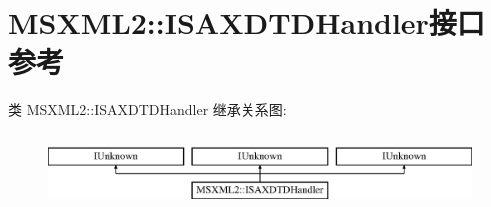 \hypertarget{interface_m_s_x_m_l2_1_1_i_s_a_x_d_t_d_handler}{}\section{M\+S\+X\+M\+L2\+:\+:I\+S\+A\+X\+D\+T\+D\+Handler接口 参考}
\label{interface_m_s_x_m_l2_1_1_i_s_a_x_d_t_d_handler}
类 M\+S\+X\+M\+L2\+:\+:I\+S\+A\+X\+D\+T\+D\+Handler 继承关系图\+:\begin{figure}[H]
\begin{center}
\leavevmode
\includegraphics[height=2.000000cm]{interface_m_s_x_m_l2_1_1_i_s_a_x_d_t_d_handler}
\end{center}
\end{figure}
